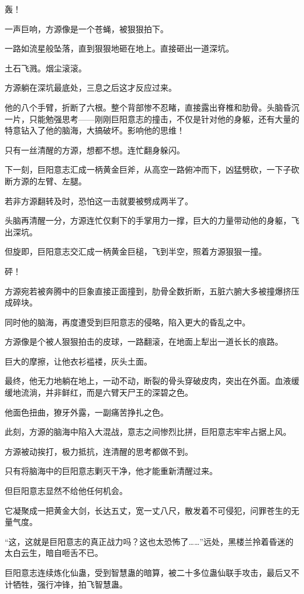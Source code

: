 \begin{this_body}
轰！

一声巨响，方源像是一个苍蝇，被狠狠拍下。

一路如流星般坠落，直到狠狠地砸在地上。直接砸出一道深坑。

土石飞溅。烟尘滚滚。

方源躺在深坑最底处，三息之后这才反应过来。

他的八个手臂，折断了六根。整个背部惨不忍睹，直接露出脊椎和肋骨。头脑昏沉一片，只能勉强思考——刚刚巨阳意志的撞击，不仅是针对他的身躯，还有大量的特意钻入了他的脑海，大搞破坏。影响他的思维！

只有一丝清醒的方源，想都不想。连忙翻身躲闪。

下一刻，巨阳意志汇成一柄黄金巨斧，从高空一路俯冲而下，凶猛劈砍，一下子砍断方源的左臂、左腿。

若非方源翻转及时，恐怕这一击就要被劈成两半了。

头脑再清醒一分，方源连忙仅剩下的手掌用力一撑，巨大的力量带动他的身躯，飞出深坑。

但旋即，巨阳意志交汇成一柄黄金巨槌，飞到半空，照着方源狠狠一撞。

砰！

方源宛若被奔腾中的巨象直接正面撞到，肋骨全数折断，五脏六腑大多被撞爆挤压成碎块。

同时他的脑海，再度遭受到巨阳意志的侵略，陷入更大的昏乱之中。

方源像是个被人狠狠拍击的皮球，一路翻滚，在地面上犁出一道长长的痕路。

巨大的摩擦，让他衣衫褴褛，灰头土面。

最终，他无力地躺在地上，一动不动，断裂的骨头穿破皮肉，突出在外面。血液缓缓地流淌，并非鲜红，而是六臂天尸王的深碧之色。

他面色扭曲，獠牙外露，一副痛苦挣扎之色。

此刻，方源的脑海中陷入大混战，意志之间惨烈比拼，巨阳意志牢牢占据上风。

方源被动挨打，极力抵抗，连清醒的思考都做不到。

只有将脑海中的巨阳意志剿灭干净，他才能重新清醒过来。

但巨阳意志显然不给他任何机会。

它凝聚成一把黄金大剑，长达五丈，宽一丈八尺，散发着不可侵犯，问罪苍生的无量气度。

“这，这就是巨阳意志的真正战力吗？这也太恐怖了……”远处，黑楼兰拎着昏迷的太白云生，暗自咂舌不已。

巨阳意志连续炼化仙蛊，受到智慧蛊的暗算，被二十多位蛊仙联手攻击，最后又不计牺牲，强行冲锋，拍飞智慧蛊。


\end{this_body}
